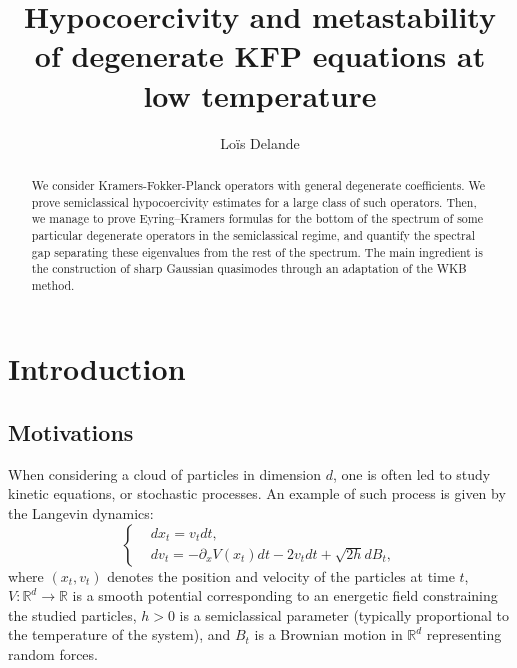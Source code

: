 \documentclass[12pt]{amsart}
\title{Hypocoercivity and metastability of degenerate KFP equations at low temperature}
\author{Loïs Delande}
\newcommand{\R}{\mathbb R}
\numberwithin{equation}{section}
\numberwithin{figure}{section}
\begin{document}
\begin{abstract}
We consider Kramers-Fokker-Planck operators with general degenerate %
coefficients. We prove semiclassical %
hypocoercivity estimates for a large class of such operators. Then, we manage to prove Eyring–Kramers formulas for the bottom of the spectrum of some particular degenerate operators in the semiclassical regime, and quantify the spectral gap separating these eigenvalues from the rest of the spectrum. The main ingredient is the construction of sharp Gaussian quasimodes through an adaptation of the WKB method.
\end{abstract}

\maketitle

\section{Introduction}

\subsection{Motivations}

When considering a cloud of particles in dimension $d$, one is often led to study kinetic equations, or stochastic processes. An example of such process is given by the Langevin dynamics:
\begin{equation}\label{eq:SDE0}
\left\{
\begin{aligned}
&dx_t = v_tdt,\\
&dv_t = -\partial_xV(x_t)dt - 2v_tdt + \sqrt{2h}dB_t,
\end{aligned}
\right.
\end{equation}
where $(x_t,v_t)$ denotes the position and velocity of %
the particles at %
time $t$, $V:\R^d\to\R$ is a smooth potential corresponding to an energetic field constraining the studied particles, $h>0$ is a semiclassical parameter (typically proportional to the temperature of the system), and $B_t$ is a Brownian motion in $\R^d$ representing random forces.
\end{document}
